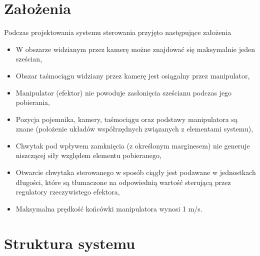 \documentclass{article}
\begin{document}
\tableofcontents
\pagebreak

\section{Założenia}

Podczas projektowania systemu sterowania przyjęto następujące założenia
\begin{itemize}
\item W obszarze widzianym przez kamerę możne znajdować się maksymalnie jeden sze\'scian,
\item Obszar ta\'smociągu widziany przez kamerę jest osiągalny przez manipulator,
\item Manipulator (efektor) nie powoduje zasłonięcia sze\'scianu podczas jego pobierania,
\item Pozycja pojemnika, kamery, ta\'smociągu oraz podstawy manipulatora są znane (położenie układów współrzędnych związanych z elementami systemu),
\item Chwytak pod wpływem zamknięcia (z okre\'slonym marginesem)  nie generuje niszczącej siły względem elementu pobieranego,
\item Otwarcie chwytaka sterowanego w sposób ciągły jest podawane w jednostkach długo\'sci, które są tłumaczone na odpowiednią warto\'sć sterującą przez regulatory rzeczywistego efektora,
\item Maksymalna prędko\'sć końcówki manipulatora wynosi 1 m/s.
\end{itemize}
\pagebreak



\section{Struktura systemu}
\end{document}
